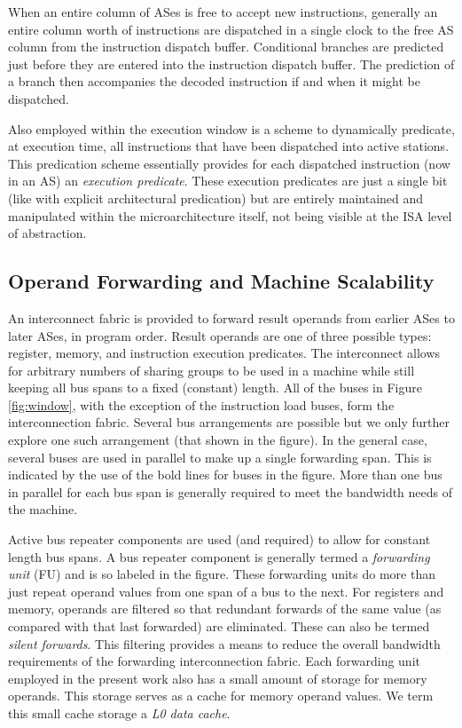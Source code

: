\documentclass[10pt,twocolumn,dvips]{article}
\begin{document}
When an entire column
of ASes is free to accept new instructions, generally
an entire column worth of instructions are dispatched in a single
clock to the free AS
column from the instruction dispatch buffer.
Conditional branches are
predicted just before they are entered into the instruction
dispatch buffer.
The prediction of a branch then accompanies the decoded instruction
if and when it might be dispatched.

Also employed within the execution window is a scheme to
dynamically predicate, at execution time, 
all instructions that have been dispatched
into active stations.  
This predication scheme essentially provides for each dispatched
instruction (now in an AS)
an \textit{execution predicate}.  These execution predicates
are just a single bit (like with explicit architectural predication)
but are entirely maintained and manipulated within the microarchitecture
itself, not being visible at the ISA level of abstraction.
%
%
\subsection{Operand Forwarding and Machine Scalability}
%
An interconnect fabric is provided to forward result
operands from earlier ASes to 
later ASes, in program order.  
Result operands are one of three possible types: register, memory, and
instruction execution predicates.
The interconnect allows for arbitrary numbers of sharing
groups to be used in a machine while still keeping all bus
spans to a fixed (constant) length.
All of the buses in
Figure \ref{fig:window}, with the exception of the instruction
load buses, form the interconnection fabric.
Several bus arrangements are possible but we only
further explore one such arrangement (that shown in the figure).
In the general case, several buses are used in parallel to make up
a single forwarding span.
This is indicated by the use of the
bold lines for buses in the figure.
More than one
bus in parallel for each bus span is generally required to meet
the bandwidth needs of the machine.

Active bus repeater components are used (and required) to 
allow for constant length bus spans.
A bus repeater component is generally termed a
\textit{forwarding unit} (FU) and is so labeled in the figure.
These forwarding units do more than just repeat operand values from
one span of a bus to the next.
For registers and memory, operands are filtered so that
redundant forwards of the same value (as compared with that last forwarded)
are eliminated.  These can also be termed \textit{silent forwards}.
This filtering provides a means to reduce the overall bandwidth
requirements of the forwarding interconnection fabric.
Each forwarding unit employed in the present work also has a small
amount of storage for memory operands.
This storage serves as a cache for memory operand values.
We term this small cache storage a \textit{L0 data cache}.
\end{document}
